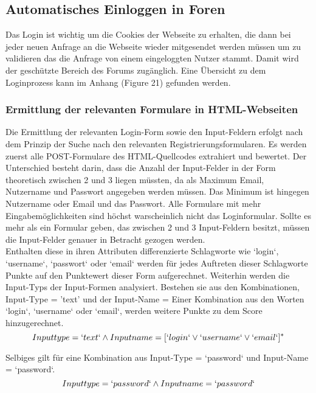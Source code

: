 
\subsection {Automatisches Einloggen in Foren}
Das Login ist wichtig um die Cookies der Webseite zu erhalten, die dann bei jeder neuen Anfrage an die Webseite wieder mitgesendet werden müssen um zu validieren das die Anfrage von einem eingeloggten Nutzer stammt. Damit wird der geschützte Bereich des Forums zugänglich.
Eine Übersicht zu dem Loginprozess kann im Anhang (Figure 21) gefunden werden.
\subsubsection{Ermittlung der relevanten Formulare in HTML-Webseiten}
Die Ermittlung der relevanten Login-Form sowie den Input-Feldern erfolgt nach dem Prinzip der Suche nach den relevanten Registrierungsformularen. Es werden zuerst alle POST-Formulare des HTML-Quellcodes extrahiert und bewertet. Der Unterschied besteht darin, dass die Anzahl der Input-Felder in der Form theoretisch zwischen 2 und 3 liegen müssten, da als Maximum Email, Nutzername und Passwort angegeben werden müssen. Das Minimum ist hingegen Nutzername oder Email und das Passwort. Alle Formulare mit mehr Eingabemöglichkeiten sind höchst warscheinlich nicht das Loginformular.
Sollte es mehr als ein Formular geben, das zwischen 2 und 3 Input-Feldern besitzt, müssen die Input-Felder genauer in Betracht gezogen werden. \\
Enthalten diese in ihren Attributen differenzierte Schlagworte wie `login`, `username`, `passwort` oder `email` werden für jedes Auftreten dieser Schlagworte Punkte auf den Punktewert dieser Form aufgerechnet. Weiterhin werden die Input-Typs der Input-Formen analysiert. Bestehen sie aus den Kombinationen, Input-Type = 'text' und der Input-Name = Einer Kombination aus den Worten `login`, `username` oder `email`, werden weitere Punkte zu dem Score hinzugerechnet.
\[Inputtype = `text` \wedge Inputname = [`login` \vee `username` \vee `email`]^*\]

 Selbiges gilt für eine Kombination aus Input-Type = `password` und Input-Name = `password`.
 \[Inputtype = `password` \wedge Inputname = `password`\]
 
